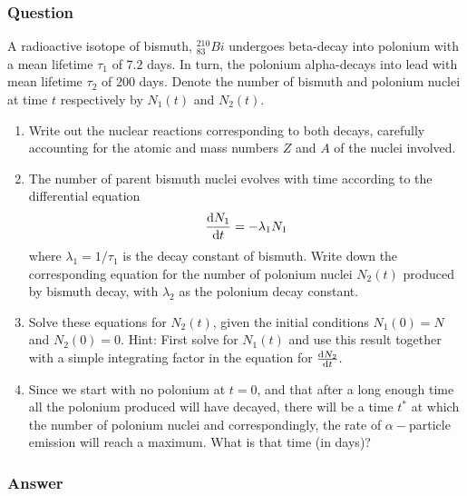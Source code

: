 \subsubsection{Question}
A radioactive isotope of bismuth, ${}^{210}_{83}Bi$ undergoes beta-decay into polonium with a mean lifetime $\tau_1$ of $7.2$ days. In turn, the polonium alpha-decays into lead with mean lifetime $\tau_2$ of $200$ days. Denote the number of bismuth and polonium nuclei at time $t$ respectively by $N_1(t)$ and $N_2(t)$.
\begin{enumerate}
	\item Write out the nuclear reactions corresponding to both decays, carefully accounting for the atomic and mass numbers $Z$ and $A$ of the nuclei involved.
	\item The number of parent bismuth nuclei evolves with time according to the differential equation 
	\begin{equation*}
		\dv{N_1}{t} = -\lambda_1N_1
	\end{equation*}
	where $\lambda_1 = 1/\tau_1$ is the decay constant of bismuth. Write down the corresponding equation for the number of polonium nuclei $N_2(t)$ produced by bismuth decay, with $\lambda_2$ as the polonium decay constant.
	\item Solve these equations for $N_2(t)$, given the initial conditions $N_1(0)=N$ and $N_2(0)=0$. Hint: First solve for $N_1(t)$ and use this result together with a simple integrating factor in the equation for $\dv{N_2}{t}.$
	\item Since we start with no polonium at $t=0$, and that after a long enough time all the polonium produced will have decayed, there will be a time $t^*$ at which the number of polonium nuclei and correspondingly, the rate of $\alpha-$particle emission will reach a maximum. What is that time (in days)?
\end{enumerate}
\subsubsection{Answer}


